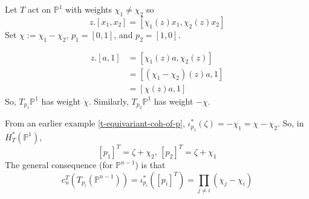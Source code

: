 \documentclass[11pt,leqno,oneside]{amsbook}
\renewcommand{\P}{\mathbb{P}}
\numberwithin{thm}{section}
\begin{document}
\begin{example}
  Let \(T\) act on \(\P^1\) with weights \(\chi_1 \neq \chi_2\) so \[
    z.[x_1,x_2] = [\chi_1(z)x_1, \chi_2(z)x_2]
  \]
  Set \(\chi := \chi_1 - \chi_2\), \(p_1 = [0,1]\), and \(p_2 =
  [1,0]\).
  
  \begin{minipage}{1.0\linewidth}
    \begin{multicols}{2}
    
      \columnbreak
    
      \begin{align*}
        z.[a,1] & = [\chi_1(z) a, \chi_2(z)] \\
                & = [(\chi_1-\chi_2)(z)a,1] \\
                & = [\chi(z)a,1]
      \end{align*}
      So, \(T_{p_1}\P^1\) has weight
      \(\chi\). Similarly, \(T_{p_2} \P^1\) has weight \(-\chi\).
    \end{multicols}
  \end{minipage}
  From an earlier example \ref{t-equivariant-coh-of-p},
  \(\iota^*_{p_1}(\zeta) = -\chi_1 = \chi-\chi_2\). So, in
  \(H_T^*(\P^1)\), \[
    [p_1]^T = \zeta+\chi_2,\, [p_2]^T = \zeta+\chi_1
  \]
  The general consequence (for \(\P^{n-1}\)) is that \[
    c_n^T(T_{p_i}(\P^{n-1})) = \iota^*_{p_i}([p_i]^T) = \prod_{j \neq i}(\chi_j-\chi_i)
  \]
\end{example}
\end{document}
